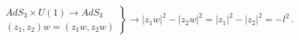 \begin{equation}
\begin{array}{llll}
&&\nonumber\\
&&\left.
\begin{array}{llll}
&&AdS_3 \times U(1)\rightarrow  AdS_3 \\
&&\left(z_1,z_2\right)w=\left(z_1w,z_2w\right)
\end{array}
\right\}
\rightarrow \left|z_1w\right|^2-\left|z_2w\right|^2 =\left|z_1\right|^2
-\left|z_2\right|^2=-l^2\,.
\end{array}
\end{equation}

